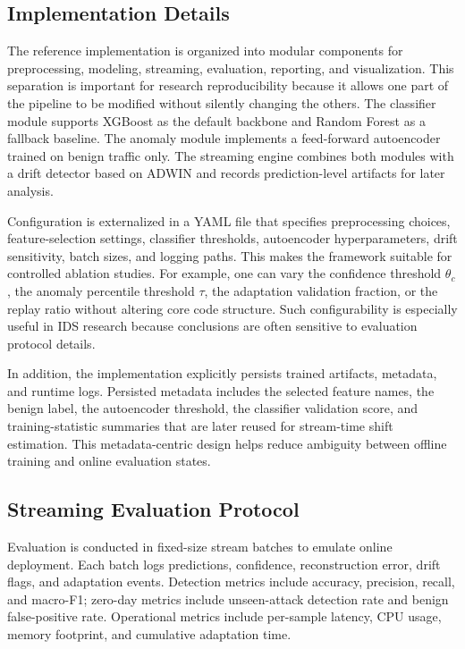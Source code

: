 \documentclass[conference]{IEEEtran}
\begin{document}
\subsection{Implementation Details}
The reference implementation is organized into modular components for preprocessing, modeling, streaming, evaluation, reporting, and visualization. This separation is important for research reproducibility because it allows one part of the pipeline to be modified without silently changing the others. The classifier module supports XGBoost as the default backbone and Random Forest as a fallback baseline. The anomaly module implements a feed-forward autoencoder trained on benign traffic only. The streaming engine combines both modules with a drift detector based on ADWIN and records prediction-level artifacts for later analysis.

Configuration is externalized in a YAML file that specifies preprocessing choices, feature-selection settings, classifier thresholds, autoencoder hyperparameters, drift sensitivity, batch sizes, and logging paths. This makes the framework suitable for controlled ablation studies. For example, one can vary the confidence threshold $\theta_c$, the anomaly percentile threshold $\tau$, the adaptation validation fraction, or the replay ratio without altering core code structure. Such configurability is especially useful in IDS research because conclusions are often sensitive to evaluation protocol details.

In addition, the implementation explicitly persists trained artifacts, metadata, and runtime logs. Persisted metadata includes the selected feature names, the benign label, the autoencoder threshold, the classifier validation score, and training-statistic summaries that are later reused for stream-time shift estimation. This metadata-centric design helps reduce ambiguity between offline training and online evaluation states.

\subsection{Streaming Evaluation Protocol}
Evaluation is conducted in fixed-size stream batches to emulate online deployment. Each batch logs predictions, confidence, reconstruction error, drift flags, and adaptation events. Detection metrics include accuracy, precision, recall, and macro-F1; zero-day metrics include unseen-attack detection rate and benign false-positive rate. Operational metrics include per-sample latency, CPU usage, memory footprint, and cumulative adaptation time.
\end{document}
